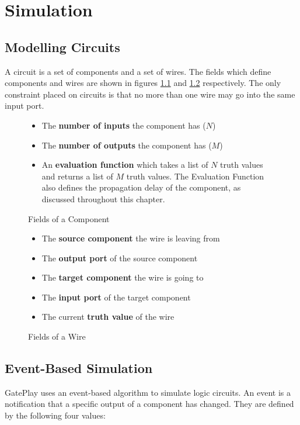 \chapter{Simulation}
\label{chapter:simulation}

\section{Modelling Circuits}
A circuit is a set of components and a set of wires. The fields which define components and wires are shown in figures \ref{fig:component} and \ref{fig:wire} respectively. The only constraint placed on circuits is that no more than one wire may go into the same input port.

\begin{figure}[H]
\centering
\begin{itemize}
	\item The \textbf{number of inputs} the component has ($N$)
	\item The \textbf{number of outputs} the component has ($M$)
	\item An \textbf{evaluation function} which takes a list of $N$ truth values and returns a list  of $M$ truth values. The Evaluation Function also defines the propagation delay of the component, as discussed throughout this chapter.
\end{itemize}
\label{fig:component}
\caption{Fields of a Component}
\end{figure}

\begin{figure}[H]
\centering
\begin{itemize}
	\item The \textbf{source component} the wire is leaving from
	\item The \textbf{output port} of the source component
	\item The \textbf{target component} the wire is going to
	\item The \textbf{input port} of the target component
	\item The current \textbf{truth value} of the wire 
\end{itemize}
\label{fig:wire}
\caption{Fields of a Wire}
\end{figure}

\section{Event-Based Simulation}
GatePlay uses an event-based algorithm to simulate logic circuits. An event is a notification that a specific output of a component has changed. They are defined by the following four values:

